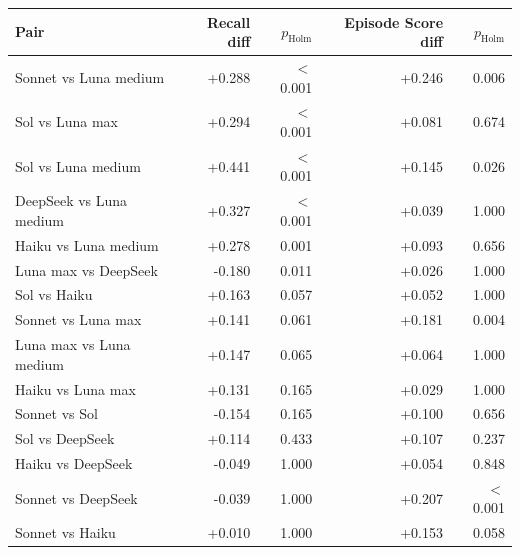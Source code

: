 \begin{tabular}{lrrrr}
\toprule
Pair & Recall diff & $p_\text{Holm}$ & Episode Score diff & $p_\text{Holm}$ \\
\midrule
Sonnet vs Luna medium & +0.288 & $<$0.001 & +0.246 & 0.006 \\
Sol vs Luna max & +0.294 & $<$0.001 & +0.081 & 0.674 \\
Sol vs Luna medium & +0.441 & $<$0.001 & +0.145 & 0.026 \\
DeepSeek vs Luna medium & +0.327 & $<$0.001 & +0.039 & 1.000 \\
Haiku vs Luna medium & +0.278 & 0.001 & +0.093 & 0.656 \\
Luna max vs DeepSeek & -0.180 & 0.011 & +0.026 & 1.000 \\
Sol vs Haiku & +0.163 & 0.057 & +0.052 & 1.000 \\
Sonnet vs Luna max & +0.141 & 0.061 & +0.181 & 0.004 \\
Luna max vs Luna medium & +0.147 & 0.065 & +0.064 & 1.000 \\
Haiku vs Luna max & +0.131 & 0.165 & +0.029 & 1.000 \\
Sonnet vs Sol & -0.154 & 0.165 & +0.100 & 0.656 \\
Sol vs DeepSeek & +0.114 & 0.433 & +0.107 & 0.237 \\
Haiku vs DeepSeek & -0.049 & 1.000 & +0.054 & 0.848 \\
Sonnet vs DeepSeek & -0.039 & 1.000 & +0.207 & $<$0.001 \\
Sonnet vs Haiku & +0.010 & 1.000 & +0.153 & 0.058 \\
\bottomrule
\end{tabular}
